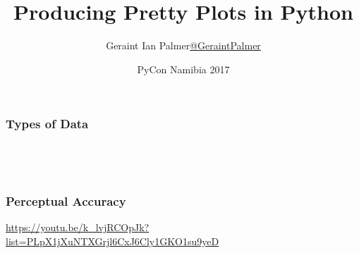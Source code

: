 \documentclass{beamer}
\title
{Producing Pretty Plots in Python}
\author{Geraint Ian Palmer\newline \footnotesize{\textcolor{orange}{\href{https://twitter.com/GeraintPalmer}{@GeraintPalmer}}}}
\date{PyCon Namibia 2017}
\begin{document}
\frame{\titlepage}

\begin{frame}
\frametitle{Types of Data}
\begin{columns}
\begin{column}{0.5\textwidth}
\begin{center}
\\

\end{center}
\end{column}
\begin{column}{0.5\textwidth}
\begin{center}
\\

\end{center}
\end{column}
\end{columns}
\end{frame}

\begin{frame}
\frametitle{Perceptual Accuracy}
\begin{center}

\tiny{\url{https://youtu.be/k_lvjRCOpJk?list=PLpX1jXuNTXGrjl6CxJ6Cly1GKO1su9yeD}}
\end{center}
\end{frame}
\end{document}
